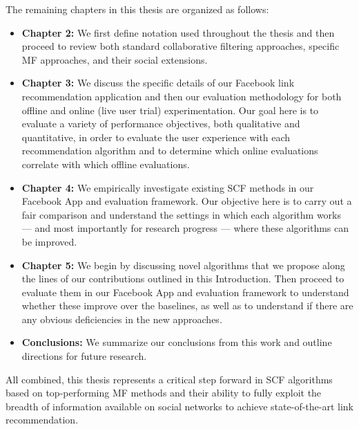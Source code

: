 The remaining chapters in this thesis are organized as follows:
\begin{itemize}
\item {\bf Chapter 2:} We first define notation
used throughout the thesis and then proceed to review both standard
collaborative filtering approaches, specific MF approaches, and
their social extensions.
\item {\bf Chapter 3:} We discuss the specific details of our
Facebook link recommendation application and then our evaluation
methodology for both offline and online (live user trial) experimentation.
Our goal here is to evaluate a variety of performance objectives,
both qualitative and quantitative, in order to evaluate the user
experience with each recommendation algorithm and to determine
which online evaluations correlate with which offline evaluations.
\item {\bf Chapter 4:} We empirically investigate 
existing SCF methods in our Facebook App and evaluation framework.
Our objective here is to carry out a fair comparison and understand
the settings in which each algorithm works --- and most importantly
for research progress --- where these algorithms can be improved.
\item {\bf Chapter 5:} We begin by discussing novel
algorithms that we propose along the lines of our contributions
outlined in this Introduction. Then proceed to evaluate
them in our Facebook App and evaluation framework to understand
whether these improve over the baselines, as well as to understand
if there are any obvious deficiencies in the new approaches.
\item {\bf Conclusions:} We summarize our conclusions
from this work and outline directions for future research.
\end{itemize}

All combined, this thesis represents a critical step forward in SCF
algorithms based on top-performing MF methods and their ability to
fully exploit the breadth of information available on social networks
to achieve state-of-the-art link recommendation.

